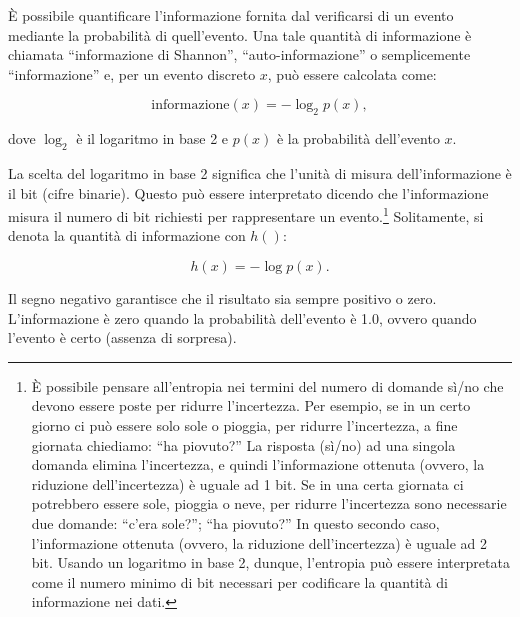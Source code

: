 \documentclass[
  11pt,
]{krantz}
\theoremstyle{definition}
\theoremstyle{definition}
\theoremstyle{definition}
\theoremstyle{definition}
\theoremstyle{remark}
\begin{document}
È possibile quantificare l'informazione fornita dal verificarsi di un evento mediante la probabilità di quell'evento. Una tale quantità di informazione è chiamata ``informazione di Shannon'', ``auto-informazione'' o semplicemente ``informazione'' e, per un evento discreto \(x\), può essere calcolata come:

\[
\text{informazione}(x) = -\log_2 p(x),
\]

dove \(\log_2\) è il logaritmo in base 2 e \(p(x)\) è la probabilità dell'evento \(x\).

La scelta del logaritmo in base 2 significa che l'unità di misura dell'informazione è il bit (cifre binarie). Questo può essere interpretato dicendo che l'informazione misura il numero di bit richiesti per rappresentare un evento.\footnote{È possibile pensare all'entropia nei termini del numero di domande sì/no che devono essere poste per ridurre l'incertezza. Per esempio, se in un certo giorno ci può essere solo sole o pioggia, per ridurre l'incertezza, a fine giornata chiediamo: ``ha piovuto?'' La risposta (sì/no) ad una singola domanda elimina l'incertezza, e quindi l'informazione ottenuta (ovvero, la riduzione dell'incertezza) è uguale ad 1 bit. Se in una certa giornata ci potrebbero essere sole, pioggia o neve, per ridurre l'incertezza sono necessarie due domande: ``c'era sole?''; ``ha piovuto?'' In questo secondo caso, l'informazione ottenuta (ovvero, la riduzione dell'incertezza) è uguale ad 2 bit. Usando un logaritmo in base 2, dunque, l'entropia può essere interpretata come il numero minimo di bit necessari per codificare la quantità di informazione nei dati.} Solitamente, si denota la quantità di informazione con \(h()\):

\[
h(x) = -\log p(x).
\]

Il segno negativo garantisce che il risultato sia sempre positivo o zero. L'informazione è zero quando la probabilità dell'evento è 1.0, ovvero quando l'evento è certo (assenza di sorpresa).
\end{document}
